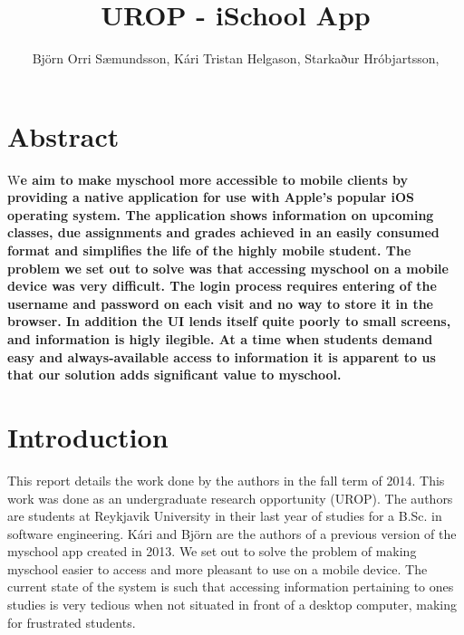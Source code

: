 \documentclass[DIV=calc, paper=a4, fontsize=11pt, twocolumn]{scrartcl}	 %
\title{UROP - iSchool App} %
\author{Björn Orri Sæmundsson, Kári Tristan Helgason, Starkaður Hróbjartsson, } %
\date{} %
\newcommand{\initial}[1]{ %
\lettrine[lines=3,lhang=0.3,nindent=0em]{
\color{DarkGray}
{\textsf{#1}}}{}}
\begin{document}
\maketitle %

\thispagestyle{fancy} %

\section*{Abstract}
\initial{W}\textbf{e aim to make myschool more accessible to mobile clients by providing a native 
    application for use with Apple's popular iOS operating system. The application shows information
on upcoming classes, due assignments and grades achieved in an easily consumed format and simplifies
the life of the highly mobile student. The problem we set out to solve was that accessing myschool 
on a mobile device was very difficult. The login process requires entering of the username and 
password on each visit and no way to store it in the browser. In addition the UI lends itself quite
poorly to small screens, and information is higly ilegible. At a time when students demand easy
and always-available access to information it is apparent to us that our solution adds significant
value to myschool.}


\section*{Introduction}

This report details the work done by the authors in the fall term of 2014. This work was done
as an undergraduate research opportunity (UROP). The authors are students at Reykjavik University
in their last year of studies for a B.Sc. in software engineering. Kári and Björn are the authors
of a previous version of the myschool app created in 2013. We set out to solve the problem of 
making myschool easier to access and more pleasant to use on a mobile device. The current state
of the system is such that accessing information pertaining to ones studies is very tedious when not
situated in front of a desktop computer, making for frustrated students. 
\end{document}
